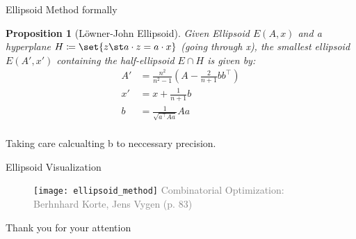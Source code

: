 \documentclass[a4paper, x11names, svgnames]{beamer}
\theoremstyle{definition}
\theoremstyle{plain}
\newtheorem*{prop}{Proposition}
\theoremstyle{plain}
\begin{document}
\begin{frame}{Ellipsoid Method formally}
    \begin{prop}[Löwner-John Ellipsoid]
        Given Ellipsoid $E(A,x)$ and a hyperplane $H\coloneqq \set{z\st a\cdot z = a\cdot x}$ (going through x),
        the smallest ellipsoid $E(A', x')$ containing the half-ellipsoid $E\cap H$ is given by:
        \begin{align*}
            A' &= \frac{n^2}{n^2-1} \left( A - \frac{2}{n+1}bb^\top \right) \\
            x' &= x + \frac{1}{n+1}b \\
            b  &= \frac{1}{\sqrt{a^\top A a}} Aa \\
        \end{align*}
    \end{prop}
    Taking care calcualting b to neccessary precision.
\end{frame}

\begin{frame}{Ellipsoid Visualization}
    \begin{figure}
        \center
        \texttt{[image: ellipsoid\_method]} %
        \vfill
        \tiny\textcolor{gray}{Combinatorial Optimization: Berhnhard Korte, Jens Vygen (p. 83)}
    \end{figure}
\end{frame}

\begin{frame}
    \Huge Thank you for your attention
\end{frame}
\end{document}
